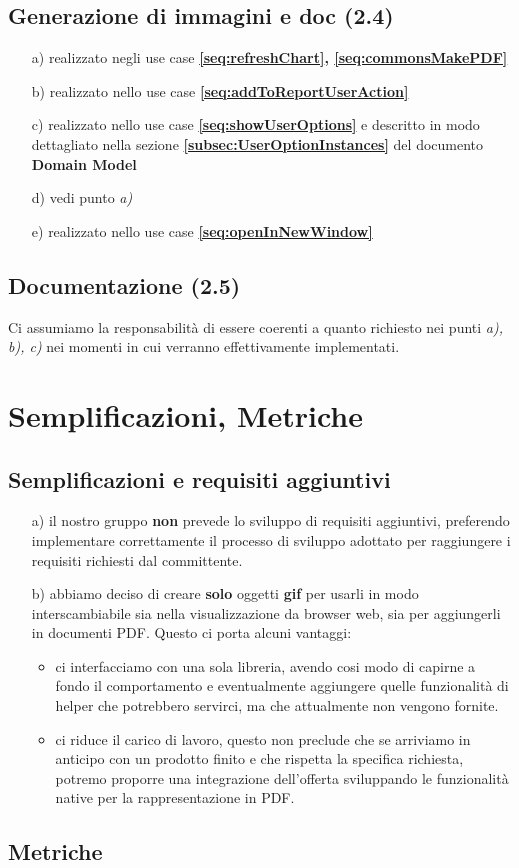 \section{Generazione di immagini e doc (2.4)}
\begin{itemize}
  \item[a)] realizzato negli use case \textbf{\ref{seq:refreshChart},
  \ref{seq:commonsMakePDF}}
  \item[b)] realizzato nello use case \textbf{\ref{seq:addToReportUserAction}}
  \item[c)] realizzato nello use case \textbf{\ref{seq:showUserOptions}} e
  descritto in modo dettagliato nella sezione
  \textbf{\ref{subsec:UserOptionInstances}}  del documento \textbf{Domain Model}
  \item[d)] vedi punto \emph{a)}
  \item[e)] realizzato nello use case \textbf{\ref{seq:openInNewWindow}}
\end{itemize}

\section{Documentazione (2.5)}
Ci assumiamo la responsabilit\`a di essere coerenti a quanto richiesto nei
punti \emph{a), b), c)} nei momenti in cui verranno effettivamente implementati.

\chapter{Semplificazioni, Metriche}
\section{Semplificazioni e requisiti aggiuntivi}
\begin{itemize}
  \item[a)] il nostro gruppo \textbf{non} prevede lo sviluppo di requisiti
  aggiuntivi, preferendo implementare correttamente il processo di sviluppo adottato per
  raggiungere i requisiti richiesti dal committente.
  \item[b)] abbiamo deciso di creare \textbf{solo} oggetti \textbf{gif} per
  usarli in modo interscambiabile sia nella visualizzazione da browser web, sia
  per aggiungerli in documenti PDF. Questo ci porta alcuni vantaggi:
  \begin{itemize}
    \item ci interfacciamo con una sola libreria, avendo cosi modo di capirne a
    fondo il comportamento e eventualmente aggiungere quelle funzionalit\`a di
    helper che potrebbero servirci, ma che attualmente non vengono fornite.
    \item ci riduce il carico di lavoro, questo non preclude che se arriviamo
    in anticipo con un prodotto finito e che rispetta la specifica richiesta,
    potremo proporre una integrazione dell'offerta sviluppando le
    funzionalit\`a native per la rappresentazione in PDF.
    \end{itemize}
\end{itemize}

\section{Metriche}